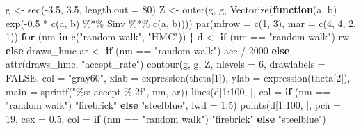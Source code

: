 \documentclass[
  letterpaper,
  DIV=11,
  numbers=noendperiod]{scrreprt}
\newenvironment{Shaded}{\begin{snugshade}}{\end{snugshade}}
\newcommand{\AttributeTok}[1]{\textcolor[rgb]{0.40,0.45,0.13}{#1}}
\newcommand{\ConstantTok}[1]{\textcolor[rgb]{0.56,0.35,0.01}{#1}}
\newcommand{\ControlFlowTok}[1]{\textcolor[rgb]{0.00,0.23,0.31}{\textbf{#1}}}
\newcommand{\DecValTok}[1]{\textcolor[rgb]{0.68,0.00,0.00}{#1}}
\newcommand{\FloatTok}[1]{\textcolor[rgb]{0.68,0.00,0.00}{#1}}
\newcommand{\FunctionTok}[1]{\textcolor[rgb]{0.28,0.35,0.67}{#1}}
\newcommand{\NormalTok}[1]{\textcolor[rgb]{0.00,0.23,0.31}{#1}}
\newcommand{\OtherTok}[1]{\textcolor[rgb]{0.00,0.23,0.31}{#1}}
\newcommand{\SpecialCharTok}[1]{\textcolor[rgb]{0.37,0.37,0.37}{#1}}
\newcommand{\StringTok}[1]{\textcolor[rgb]{0.13,0.47,0.30}{#1}}
\begin{document}
\begin{Shaded}
\begin{Highlighting}[]
\NormalTok{g }\OtherTok{\textless{}{-}} \FunctionTok{seq}\NormalTok{(}\SpecialCharTok{{-}}\FloatTok{3.5}\NormalTok{, }\FloatTok{3.5}\NormalTok{, }\AttributeTok{length.out =} \DecValTok{80}\NormalTok{)}
\NormalTok{Z }\OtherTok{\textless{}{-}} \FunctionTok{outer}\NormalTok{(g, g, }\FunctionTok{Vectorize}\NormalTok{(}\ControlFlowTok{function}\NormalTok{(a, b) }\FunctionTok{exp}\NormalTok{(}\SpecialCharTok{{-}}\FloatTok{0.5} \SpecialCharTok{*} \FunctionTok{c}\NormalTok{(a, b) }\SpecialCharTok{\%*\%}\NormalTok{ Sinv }\SpecialCharTok{\%*\%} \FunctionTok{c}\NormalTok{(a, b))))}
\FunctionTok{par}\NormalTok{(}\AttributeTok{mfrow =} \FunctionTok{c}\NormalTok{(}\DecValTok{1}\NormalTok{, }\DecValTok{3}\NormalTok{), }\AttributeTok{mar =} \FunctionTok{c}\NormalTok{(}\DecValTok{4}\NormalTok{, }\DecValTok{4}\NormalTok{, }\DecValTok{2}\NormalTok{, }\DecValTok{1}\NormalTok{))}
\ControlFlowTok{for}\NormalTok{ (nm }\ControlFlowTok{in} \FunctionTok{c}\NormalTok{(}\StringTok{"random walk"}\NormalTok{, }\StringTok{"HMC"}\NormalTok{)) \{}
\NormalTok{    d }\OtherTok{\textless{}{-}} \ControlFlowTok{if}\NormalTok{ (nm }\SpecialCharTok{==} \StringTok{"random walk"}\NormalTok{) rw }\ControlFlowTok{else}\NormalTok{ draws\_hmc}
\NormalTok{    ar }\OtherTok{\textless{}{-}} \ControlFlowTok{if}\NormalTok{ (nm }\SpecialCharTok{==} \StringTok{"random walk"}\NormalTok{) acc }\SpecialCharTok{/} \DecValTok{2000} \ControlFlowTok{else} \FunctionTok{attr}\NormalTok{(draws\_hmc, }\StringTok{"accept\_rate"}\NormalTok{)}
    \FunctionTok{contour}\NormalTok{(g, g, Z, }\AttributeTok{nlevels =} \DecValTok{6}\NormalTok{, }\AttributeTok{drawlabels =} \ConstantTok{FALSE}\NormalTok{, }\AttributeTok{col =} \StringTok{"gray60"}\NormalTok{,}
            \AttributeTok{xlab =} \FunctionTok{expression}\NormalTok{(theta[}\DecValTok{1}\NormalTok{]), }\AttributeTok{ylab =} \FunctionTok{expression}\NormalTok{(theta[}\DecValTok{2}\NormalTok{]),}
            \AttributeTok{main =} \FunctionTok{sprintf}\NormalTok{(}\StringTok{"\%s: accept \%.2f"}\NormalTok{, nm, ar))}
    \FunctionTok{lines}\NormalTok{(d[}\DecValTok{1}\SpecialCharTok{:}\DecValTok{100}\NormalTok{, ], }\AttributeTok{col =} \ControlFlowTok{if}\NormalTok{ (nm }\SpecialCharTok{==} \StringTok{"random walk"}\NormalTok{) }\StringTok{"firebrick"} \ControlFlowTok{else} \StringTok{"steelblue"}\NormalTok{, }\AttributeTok{lwd =} \FloatTok{1.5}\NormalTok{)}
    \FunctionTok{points}\NormalTok{(d[}\DecValTok{1}\SpecialCharTok{:}\DecValTok{100}\NormalTok{, ], }\AttributeTok{pch =} \DecValTok{19}\NormalTok{, }\AttributeTok{cex =} \FloatTok{0.5}\NormalTok{, }\AttributeTok{col =} \ControlFlowTok{if}\NormalTok{ (nm }\SpecialCharTok{==} \StringTok{"random walk"}\NormalTok{) }\StringTok{"firebrick"} \ControlFlowTok{else} \StringTok{"steelblue"}\NormalTok{)}

\end{Highlighting}
\end{Shaded}
\end{document}
